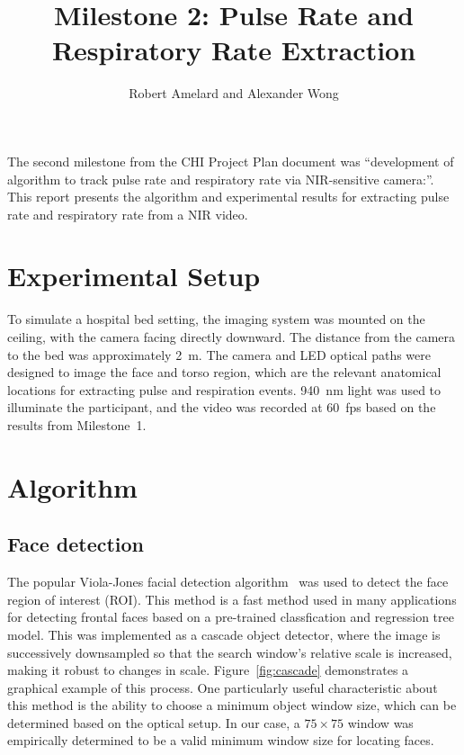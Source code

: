 \documentclass{article}
\begin{document}
\title{Milestone 2: Pulse Rate and Respiratory Rate Extraction}
\author{Robert Amelard and Alexander Wong}
\maketitle

\noindent The second milestone from the CHI Project Plan document was ``development of algorithm to track pulse rate and respiratory rate via NIR-sensitive camera:''. This report presents the algorithm and experimental results for extracting pulse rate and respiratory rate from a NIR video.

\section{Experimental Setup}
To simulate a hospital bed setting, the imaging system was mounted on the ceiling, with the camera facing directly downward. The distance from the camera to the bed was approximately 2~m. The camera and LED optical paths were designed to image the face and torso region, which are the relevant anatomical locations for extracting pulse and respiration events. 940~nm light was used to illuminate the participant, and the video was recorded at 60~fps based on the results from Milestone~1.

\section{Algorithm}

\subsection{Face detection}
The popular Viola-Jones facial detection algorithm~\cite{violajones} was used to detect the face region of interest (ROI). This method is a fast method used in many applications for detecting frontal faces based on a pre-trained classfication and regression tree model. This was implemented as a cascade object detector, where the image is successively downsampled so that the search window's relative scale is increased, making it robust to changes in scale. Figure~\ref{fig:cascade} demonstrates a graphical example of this process. One particularly useful characteristic about this method is the ability to choose a minimum object window size, which can be determined based on the optical setup. In our case, a $75 \times 75$ window was empirically determined to be a valid minimum window size for locating faces.
\end{document}
